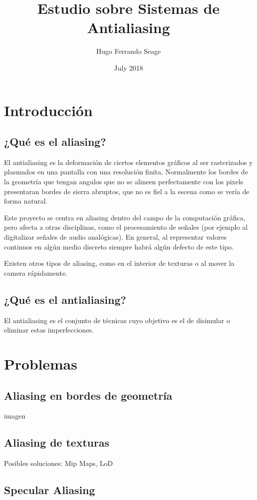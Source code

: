 \documentclass[withindex, glossary]{cam-thesis}
\title{Estudio sobre Sistemas de Antialiasing}
\author{Hugo Ferrando Seage}
\date{July 2018}
\begin{document}
\frontmatter{}

\chapter{Introducción}
\section{¿Qué es el aliasing?}

El antialiasing es la deformación de ciertos elementos gráficos al ser rasterizados y plasmados en una pantalla con una resolución finita. Normalmente los bordes de la geometría que tengan angulos que no se alineen perfectamente con los pixels presentaran bordes de sierra abruptos, que no es fiel a la escena como se vería de forma natural.

Este proyecto se centra en aliasing dentro del campo de la computación gráfica, pero afecta a otras disciplinas, como el procesamiento de señales (por ejemplo al digitalizar señales de audio analógicas). En general, al representar valores continuos en algún medio discreto siempre habrá algún defecto de este tipo.

Existen otros tipos de aliasing, como en el interior de texturas o al mover la camera rápidamente.

\section{¿Qué es el antialiasing?}

El antialiasing es el conjunto de técnicas cuyo objetivo es el de disimular o eliminar estas imperfecciones.

\chapter{Problemas}

\section{Aliasing en bordes de geometría}
imagen

\section{Aliasing de texturas}
Posibles soluciones: Mip Maps, LoD

\section{Specular Aliasing}
\end{document}
